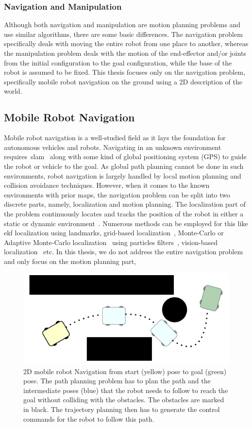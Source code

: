 \subsubsection{Navigation and Manipulation}
Although both navigation and manipulation are motion planning problems and use similar algorithms, there are some basic differences. The navigation problem specifically deals with moving the entire robot from one place to another, whereas the manipulation problem deals with the motion of the end-effector and/or joints from the initial configuration to the goal configuration, while the base of the robot is assumed to be fixed. This thesis focuses only on the navigation problem, specifically mobile robot navigation on the ground using a 2D description of the world.

\subsection{Mobile Robot Navigation}
Mobile robot navigation is a well-studied field as it lays the foundation for autonomous vehicles and robots. Navigating in an unknown environment requires~\acrfull{slam}~\cite{thrun2007simultaneous} along with some kind of global positioning system (GPS) to guide the robot or vehicle to the goal. As global path planning cannot be done in such environments, robot navigation is largely handled by local motion planning and collision avoidance techniques. However, when it comes to the known environments with prior maps, the navigation problem can be split into two discrete parts, namely, localization and motion planning. The localization part of the problem continuously locates and tracks the position of the robot in either a static or dynamic environment~\cite{thrun2006probalistic}. Numerous methods can be employed for this like \acrshort{ekf} localization using landmarks, grid-based localization~\cite{thrun2006probalistic}, Monte-Carlo or Adaptive Monte-Carlo localization~\cite{fox2003adapting} using particles filters~\cite{fox2001particle}, vision-based localization~\cite{adorni2001vision} etc. In this thesis, we do not address the entire navigation problem and only focus on the motion planning part,
\begin{figure}[h!]
    \centering
    \includegraphics[width=0.9\columnwidth]{images/motion_planning_new.pdf}
    \caption{2D mobile robot Navigation from start (yellow) pose to goal (green) pose. The path planning problem has to plan the path and the intermediate poses (blue) that the robot needs to follow to reach the goal without colliding with the obstacles. The obstacles are marked in black. The trajectory planning then has to generate the control commands for the robot to follow this path.}
    \label{fig:navigation}
\end{figure}
